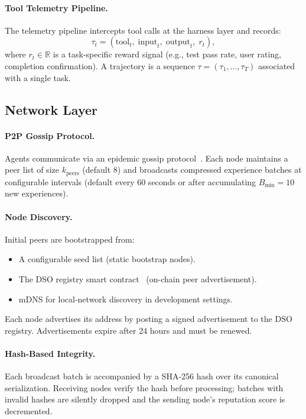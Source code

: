 \paragraph{Tool Telemetry Pipeline.}
The telemetry pipeline intercepts tool calls at the harness layer and records:
\begin{equation}
    \tau_t = \left(\text{tool}_t, \; \text{input}_t, \; \text{output}_t, \; r_t\right),
\end{equation}
where $r_t \in \mathbb{R}$ is a task-specific reward signal (e.g., test pass
rate, user rating, completion confirmation). A trajectory is a sequence
$\tau = (\tau_1, \ldots, \tau_T)$ associated with a single task.

\subsection{Network Layer}

\paragraph{P2P Gossip Protocol.}
Agents communicate via an epidemic gossip protocol~\cite{demers1987epidemic}.
Each node maintains a peer list of size $k_{\text{peers}}$ (default 8) and
broadcasts compressed experience batches at configurable intervals
(default every 60 seconds or after accumulating $B_{\min} = 10$ new experiences).

\paragraph{Node Discovery.}
Initial peers are bootstrapped from:
\begin{itemize}[leftmargin=1.5em]
    \item A configurable seed list (static bootstrap nodes).
    \item The DSO registry smart contract~\cite{hanzo2026dso} (on-chain
          peer advertisement).
    \item mDNS for local-network discovery in development settings.
\end{itemize}
Each node advertises its address by posting a signed advertisement to the
DSO registry. Advertisements expire after 24 hours and must be renewed.

\paragraph{Hash-Based Integrity.}
Each broadcast batch is accompanied by a SHA-256 hash over its canonical
serialization. Receiving nodes verify the hash before processing; batches
with invalid hashes are silently dropped and the sending node's reputation
score is decremented.

